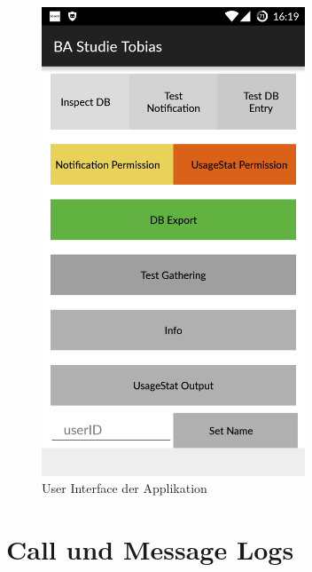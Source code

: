 \begin{figure}[htbp]
    \centering
    \includegraphics[width=0.7\textwidth]{images/screenshot1.png}
    \caption{User Interface der Applikation}
    \label{fig:uiscreen}
\end{figure}

\section{Call und Message Logs}

